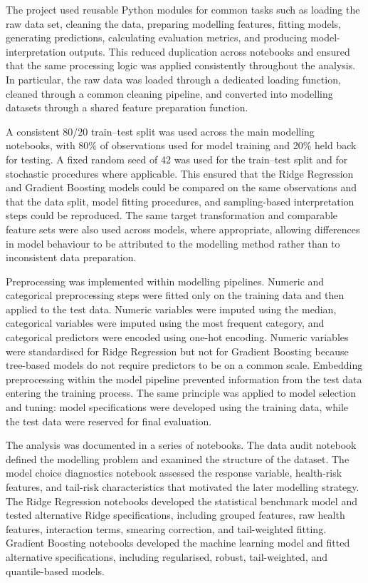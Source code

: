 	The project used reusable Python modules for common tasks such as loading the raw data set, cleaning the data, preparing modelling features, fitting models, generating predictions, calculating evaluation metrics, and producing model-interpretation outputs. This reduced duplication across notebooks and ensured that the same processing logic was applied consistently throughout the analysis. In particular, the raw data was loaded through a dedicated loading function, cleaned through a common cleaning pipeline, and converted into modelling datasets through a shared feature preparation function.
	
	A consistent 80/20 train--test split was used across the main modelling notebooks, with 80\% of observations used for model training and 20\% held back for testing. A fixed random seed of 42 was used for the train--test split and for stochastic procedures where applicable. This ensured that the Ridge Regression and Gradient Boosting models could be compared on the same observations and that the data split, model fitting procedures, and sampling-based interpretation steps could be reproduced. The same target transformation and comparable feature sets were also used across models, where appropriate, allowing differences in model behaviour to be attributed to the modelling method rather than to inconsistent data preparation.
	
	Preprocessing was implemented within modelling pipelines. Numeric and categorical preprocessing steps were fitted only on the training data and then applied to the test data. Numeric variables were imputed using the median, categorical variables were imputed using the most frequent category, and categorical predictors were encoded using one-hot encoding. Numeric variables were standardised for Ridge Regression but not for Gradient Boosting because tree-based models do not require predictors to be on a common scale. Embedding preprocessing within the model pipeline prevented information from the test data entering the training process. The same principle was applied to model selection and tuning: model specifications were developed using the training data, while the test data were reserved for final evaluation.
	
	The analysis was documented in a series of notebooks. The data audit notebook defined the modelling problem and examined the structure of the dataset. The model choice diagnostics notebook assessed the response variable, health-risk features, and tail-risk characteristics that motivated the later modelling strategy. The Ridge Regression notebooks developed the statistical benchmark model and tested alternative Ridge specifications, including grouped features, raw health features, interaction terms, smearing correction, and tail-weighted fitting. Gradient Boosting notebooks developed the machine learning model and fitted alternative specifications, including regularised, robust, tail-weighted, and quantile-based models.
	
